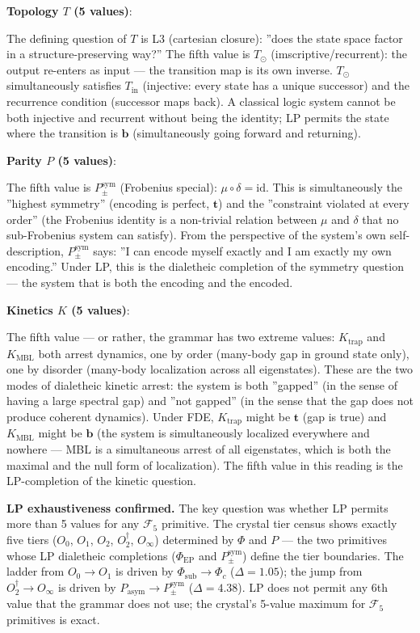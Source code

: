 \documentclass[12pt,a4paper]{article}
\begin{document}
\textbf{Topology $T$ (5 values)}:

The defining question of $T$ is L3 (cartesian closure): ''does the state space factor in a structure-preserving way?'' The fifth value is $T_{\odot}$ (imscriptive/recurrent): the output re-enters as input --- the transition map is its own inverse. $T_{\odot}$ simultaneously satisfies $T_\text{in}$ (injective: every state has a unique successor) and the recurrence condition (successor maps back). A classical logic system cannot be both injective and recurrent without being the identity; LP permits the state where the transition is $\mathbf{b}$ (simultaneously going forward and returning).

\textbf{Parity $P$ (5 values)}:

The fifth value is $P_{\pm}^{\text{sym}}$ (Frobenius special): $\mu \circ \delta = \text{id}$. This is simultaneously the ''highest symmetry'' (encoding is perfect, $\mathbf{t}$) and the ''constraint violated at every order'' (the Frobenius identity is a non-trivial relation between $\mu$ and $\delta$ that no sub-Frobenius system can satisfy). From the perspective of the system's own self-description, $P_{\pm}^{\text{sym}}$ says: ''I can encode myself exactly and I am exactly my own encoding.'' Under LP, this is the dialetheic completion of the symmetry question --- the system that is both the encoding and the encoded.

\textbf{Kinetics $K$ (5 values)}:

The fifth value --- or rather, the grammar has two extreme values: $K_\text{trap}$ and $K_\text{MBL}$ both arrest dynamics, one by order (many-body gap in ground state only), one by disorder (many-body localization across all eigenstates). These are the two modes of dialetheic kinetic arrest: the system is both ''gapped'' (in the sense of having a large spectral gap) and ''not gapped'' (in the sense that the gap does not produce coherent dynamics). Under FDE, $K_\text{trap}$ might be $\mathbf{t}$ (gap is true) and $K_\text{MBL}$ might be $\mathbf{b}$ (the system is simultaneously localized everywhere and nowhere --- MBL is a simultaneous arrest of all eigenstates, which is both the maximal and the null form of localization). The fifth value in this reading is the LP-completion of the kinetic question.

\textbf{LP exhaustiveness confirmed.} The key question was whether LP permits more than 5 values for any $\mathcal{F}_5$ primitive. The crystal tier census shows exactly five tiers ($O_0$, $O_1$, $O_2$, $O_2^\dagger$, $O_\infty$) determined by $\Phi$ and $P$ --- the two primitives whose LP dialetheic completions ($\Phi_\text{EP}$ and $P_{\pm}^{\text{sym}}$) define the tier boundaries. The ladder from $O_0 \to O_1$ is driven by $\Phi_\text{sub} \to \Phi_c$ ($\Delta = 1.05$); the jump from $O_2^\dagger \to O_\infty$ is driven by $P_\text{asym} \to P_{\pm}^{\text{sym}}$ ($\Delta = 4.38$). LP does not permit any 6th value that the grammar does not use; the crystal's 5-value maximum for $\mathcal{F}_5$ primitives is exact.
\end{document}
